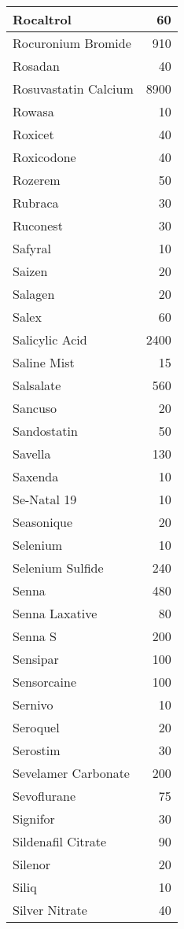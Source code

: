 \documentclass[
]{article}
\begin{document}
\begin{table}
\begin{tabular}[t]{l|r}
\hline
Rocaltrol & 60\\
\hline
Rocuronium Bromide & 910\\
\hline
Rosadan & 40\\
\hline
Rosuvastatin Calcium & 8900\\
\hline
Rowasa & 10\\
\hline
Roxicet & 40\\
\hline
Roxicodone & 40\\
\hline
Rozerem & 50\\
\hline
Rubraca & 30\\
\hline
Ruconest & 30\\
\hline
Safyral & 10\\
\hline
Saizen & 20\\
\hline
Salagen & 20\\
\hline
Salex & 60\\
\hline
Salicylic Acid & 2400\\
\hline
Saline Mist & 15\\
\hline
Salsalate & 560\\
\hline
Sancuso & 20\\
\hline
Sandostatin & 50\\
\hline
Savella & 130\\
\hline
Saxenda & 10\\
\hline
Se-Natal 19 & 10\\
\hline
Seasonique & 20\\
\hline
Selenium & 10\\
\hline
Selenium Sulfide & 240\\
\hline
Senna & 480\\
\hline
Senna Laxative & 80\\
\hline
Senna S & 200\\
\hline
Sensipar & 100\\
\hline
Sensorcaine & 100\\
\hline
Sernivo & 10\\
\hline
Seroquel & 20\\
\hline
Serostim & 30\\
\hline
Sevelamer Carbonate & 200\\
\hline
Sevoflurane & 75\\
\hline
Signifor & 30\\
\hline
Sildenafil Citrate & 90\\
\hline
Silenor & 20\\
\hline
Siliq & 10\\
\hline
Silver Nitrate & 40\\
\hline

\end{tabular}
\end{table}
\end{document}
